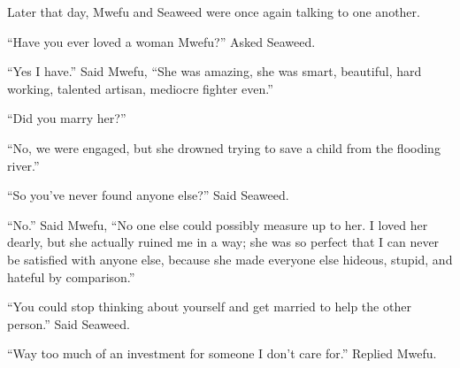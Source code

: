 \tbreak

Later that day, Mwefu and Seaweed were once again talking to one another.

``Have you ever loved a woman Mwefu?'' Asked Seaweed.

``Yes I have.'' Said Mwefu, ``She was amazing, she was smart, beautiful, hard working, talented artisan, mediocre fighter even.''

``Did you marry her?''

``No, we were engaged, but she drowned trying to save a child from the flooding river.''

``So you've never found anyone else?'' Said Seaweed.

``No.'' Said Mwefu, ``No one else could possibly measure up to her. I loved her dearly, but she actually ruined me in a way; she was so perfect that I can never be satisfied with anyone else, because she made everyone else hideous, stupid, and hateful by comparison.''

``You could stop thinking about yourself and get married to help the other person.'' Said Seaweed.

``Way too much of an investment for someone I don't care for.'' Replied Mwefu.
